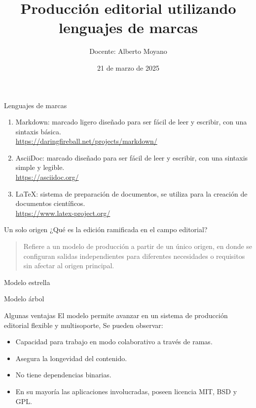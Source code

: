\documentclass[14pt,aspectratio=169]{beamer}
\title{Producción editorial utilizando lenguajes de marcas}
\author{Docente: Alberto Moyano}
\date{21 de marzo de 2025}
\institute{\url{https://github.com/albertomoyano/seminarioUBA2025}}
\begin{document}
	\begin{frame}
		\titlepage
	\end{frame}

\begin{frame}{Lenguajes de marcas}
	\begin{enumerate}
		\item Markdown: marcado ligero diseñado para ser fácil de leer y escribir, con una sintaxis básica.\\
		\url{https://daringfireball.net/projects/markdown/}
		\item AsciiDoc: marcado diseñado para ser fácil de leer y escribir, con una sintaxis simple y legible.\\
		\url{https://asciidoc.org/}
		\item LaTeX: sistema de preparación de documentos, se utiliza para la creación de documentos científicos.\\
		\url{https://www.latex-project.org/}
		\end{enumerate}
\end{frame}

\begin{frame}{Un solo origen}
	¿Qué es la edición ramificada en el campo editorial?\vspace{14pt}

	\begin{quote}
	Refiere a un modelo de producción a partir de un único origen, en donde se configuran salidas independientes para diferentes necesidades o requisitos sin afectar al origen principal.
	\end{quote}
\end{frame}

\begin{frame}{Modelo estrella}
	\begin{figure}
		\centering
	\end{figure}
\end{frame}

\begin{frame}{Modelo árbol}
	\begin{figure}
		\centering
	\end{figure}
\end{frame}

\begin{frame}{Algunas ventajas}
El modelo permite avanzar en un sistema de producción editorial flexible y multisoporte, Se pueden observar:

\begin{itemize}
	\item<2-> Capacidad para trabajo en modo colaborativo a través de ramas.
	\item<3-> Asegura la longevidad del contenido.
	\item<4-> No tiene dependencias binarias.
	\item<5-> En su mayoría las aplicaciones involucradas, poseen licencia MIT, BSD y GPL.
\end{itemize}
\end{frame}
\end{document}
